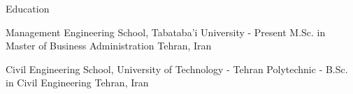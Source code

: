 \documentclass[../professional-cv.tex]{subfiles}
\begin{document}
	\begin{rSection}{ Education }
		
		
		\rSubsectionHeading
		{Management Engineering School, \Allameh Tabataba'i University}
		{  - Present }
		{\normalfont M.Sc. in Master of Business Administration}
		{Tehran, Iran}
	
		\rSubsectionHeading
		{Civil Engineering School, \Amirkabir University of Technology - Tehran Polytechnic}
		{  -  }
		{\normalfont B.Sc. in Civil Engineering}
		{Tehran, Iran}
		
		
	\end{rSection}
\end{document}
